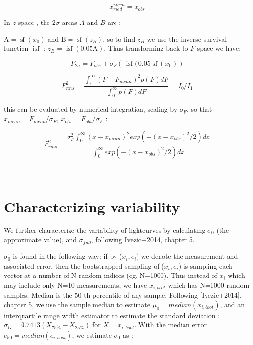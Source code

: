 \documentclass[fleqn,usenatbib]{mnras}  %
\DeclareMathOperator\sf{sf}
\DeclareMathOperator\isf{isf}
\begin{document}
\begin{equation}
x_{med}^{norm} = x_{obs}
\end{equation}


\bigskip

In $z$  space , the $2\sigma$ areas  $A$ and $B$ are :

$\text{A} = \sf(x_{0})$ and $\text{B} = \sf(z_{B})$, so to find  $z_{B}$ we use the  inverse survival function $\isf$ : $z_{B} = \isf(0.05 \text{A})$. Thus transforming back to $F$-space we have:

\begin{equation}
F_{2\sigma} = F_{obs} + \sigma_{F} \left(\, \isf (\, 0.05 \sf (x_{0})  \right)
\end{equation}

\bigskip


\begin{equation}
F_{rms}^{2} = \frac{\int _{0} ^ {\infty}{(F-F_{mean})^{2} p(F) dF}}{\int _{0} ^ {\infty}{p(F) dF}} = I_{0} / I_{1}
\end{equation}

this can be evaluated by numerical integration, scaling by $\sigma_{F}$, so that $x_{mean} = F_{mean} / \sigma_{F}$, $x_{obs} = F_{obs} / \sigma_{F}$ : 

\begin{equation}
F_{rms}^{2} = \frac{\sigma_{F}^{2} \int_{0}^{\infty} {(x-x_{mean})^{2} exp(-(x-x_{obs})^{2} / 2 ) dx }}  {\int_{0}^{\infty} {exp(-(x-x_{obs})^{2} / 2 ) dx }}
\end{equation}


\section{\\ Characterizing variability}
\label{App:AppendixB}


We further characterize the variability of lightcurves by calculating $\sigma_{0}$ (the approximate value), and $\sigma_{full}$, following Ivezic+2014, chapter 5. 

$\sigma_{0}$ is found in the following way: if by ($x_{i}, e_{i}$) we denote the measurement and associated error, then the bootstrapped sampling of ($x_{i}, e_{i}$) is sampling each vector at a number of N random indices (eg. N=1000). Thus instead of $x_{i}$ which may include only N=10 measurements, we have $x_{i,boot}$ which has N=1000 random samples. Median is the 50-th percentile of any sample.  Following [Ivezic+2014], chapter 5, we use the sample median to estimate $\mu_{0} = median(x_{i,boot})$, and an interquartile range width estimator to estimate the standard deviation : $\sigma_{G} =0.7413 (X_{75\%} - X_{25\%}) $ for $X = x_{i,boot}$.
With the median error $e_{50} = median(e_{i,boot})$, we estimate $\sigma_{0}$ as : 
\end{document}
